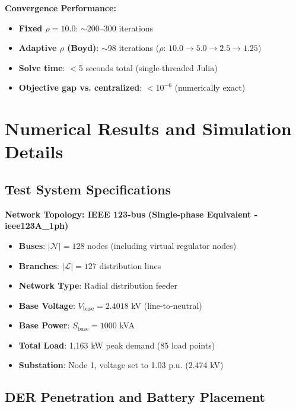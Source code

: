 \documentclass[11pt]{article}
\begin{document}
\textbf{Convergence Performance:}
\begin{itemize}
    \item \textbf{Fixed $\rho = 10.0$}: $\sim$200--300 iterations
    \item \textbf{Adaptive $\rho$ (Boyd)}: $\sim$98 iterations ($\rho$: $10.0 \to 5.0 \to 2.5 \to 1.25$)
    \item \textbf{Solve time}: $<$5 seconds total (single-threaded Julia)
    \item \textbf{Objective gap vs. centralized}: $<10^{-6}$ (numerically exact)
\end{itemize}

\clearpage

\section{Numerical Results and Simulation Details}

\subsection{Test System Specifications}

\textbf{Network Topology: IEEE 123-bus (Single-phase Equivalent - ieee123A\_1ph)}
\begin{itemize}
    \item \textbf{Buses}: $|\mathcal{N}| = 128$ nodes (including virtual regulator nodes)
    \item \textbf{Branches}: $|\mathcal{L}| = 127$ distribution lines
    \item \textbf{Network Type}: Radial distribution feeder
    \item \textbf{Base Voltage}: $V_{\text{base}} = 2.4018$ kV (line-to-neutral)
    \item \textbf{Base Power}: $S_{\text{base}} = 1000$ kVA
    \item \textbf{Total Load}: 1,163 kW peak demand (85 load points)
    \item \textbf{Substation}: Node 1, voltage set to 1.03 p.u. (2.474 kV)
\end{itemize}

\subsection{DER Penetration and Battery Placement}
\end{document}
